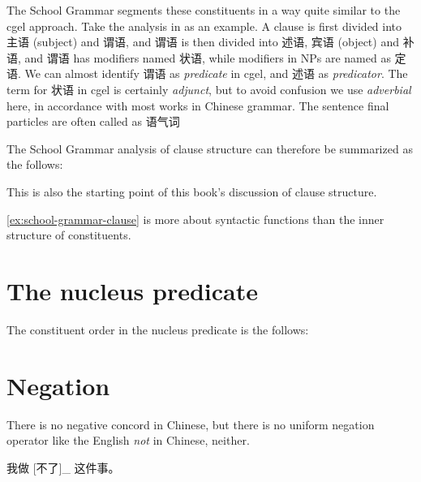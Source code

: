 \documentclass[../main.tex]{subfiles}
\begin{document}
The School Grammar segments these constituents in a way quite similar to the \ac{cgel} approach. 
Take the analysis in \citet[]{xianhan2004} as an example.
A clause is first divided into 主语 (subject) and 谓语, and 谓语 is then divided into 述语, 宾语 (object) and 补语,
and 谓语 has modifiers named 状语, while modifiers in NPs are named as 定语. We can almost identify 
谓语 as \emph{predicate} in \ac{cgel}, and 述语 as \emph{predicator}. 
The term for 状语 in \ac{cgel} is certainly \emph{adjunct}, but to avoid confusion we use \emph{adverbial}
here, in accordance with most works in Chinese grammar. 
The sentence final particles are often called as 语气词 %

The School Grammar analysis of clause structure can therefore be summarized as the follows:
\begin{exe}
    \ex\label{ex:school-grammar-clause} 
    
\end{exe}
This is also the starting point of this book's discussion of clause structure. 

\eqref{ex:school-grammar-clause} is more about syntactic functions than the inner structure of constituents.

\section{The nucleus predicate}

The constituent order in the nucleus predicate is the follows:
\begin{exe}
    \ex 
\end{exe}

\section{Negation}

There is no negative concord in Chinese, but there is no uniform negation operator like the English 
\emph{not} in Chinese, neither. 

\begin{exe}
    \ex \begin{xlist}
        \ex 我做 [不了]_{} 这件事。
    \end{xlist}    
\end{exe}

\end{document}
